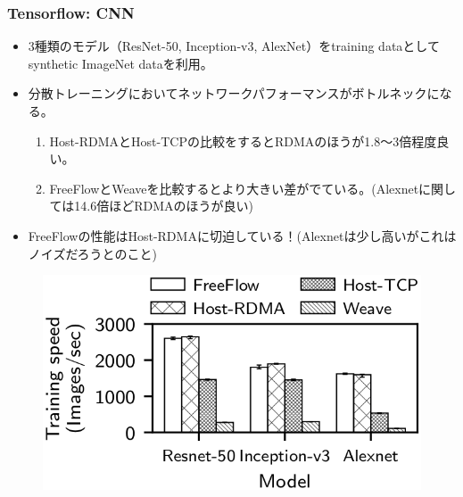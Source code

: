 \documentclass[dvipdfmx,9pt,notheorems]{beamer}
\theoremstyle{definition}
\begin{document}
\begin{frame}\frametitle{Tensorflow: CNN}
	\begin{itemize}
		\item 3種類のモデル（ResNet-50, Inception-v3, AlexNet）をtraining dataとしてsynthetic ImageNet dataを利用。
		\item 分散トレーニングにおいてネットワークパフォーマンスがボトルネックになる。
		\begin{enumerate}
			\item Host-RDMAとHost-TCPの比較をするとRDMAのほうが1.8〜3倍程度良い。
			\item FreeFlowとWeaveを比較するとより大きい差がでている。(Alexnetに関しては14.6倍ほどRDMAのほうが良い)
		\end{enumerate}
		\item FreeFlowの性能はHost-RDMAに切迫している！(Alexnetは少し高いがこれはノイズだろうとのこと)
	\end{itemize}
  \begin{figure}[htb]
    \centering
		\includegraphics[scale=1]{fig/figure15-a.png}
  \end{figure}
\end{frame}
\end{document}
